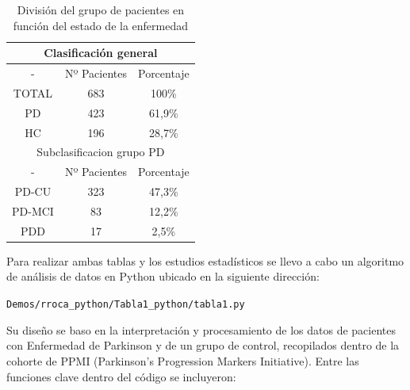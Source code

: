 \begin{table}[t]
	\centering
	\begin{tabular}{|c||c|c|} 
		\hline
		\multicolumn{3}{|c|}{Clasificación general} \\
		\hline
		- &  Nº Pacientes &  Porcentaje\\ 
		\hline
		TOTAL &  683 & 100\% \\
		\hline
		PD & 423 &  61,9\%  \\
		\hline
		HC & 196  &  28,7\%  \\
		\hline
		\multicolumn{3}{|c|}{Subclasificacion grupo PD} \\
		\hline
		- &  Nº Pacientes &  Porcentaje\\
		\hline
		PD-CU &  323 &  47,3\%  \\
		\hline
		PD-MCI &   83 &   12,2\% \\
		\hline
		PDD &  17 &  2,5\%  \\ 
		\bottomrule
	\end{tabular}
	\caption{División del grupo de pacientes en función del estado de la enfermedad}
	\label{tab:tabla4}
\end{table}


Para realizar ambas tablas y los estudios estadísticos se llevo a cabo un algoritmo de análisis de datos en Python ubicado en la siguiente dirección:
\begin{center}
	\texttt{Demos/rroca\_python/Tabla1\_python/tabla1.py}
\end{center} 
Su diseño se baso en la interpretación y procesamiento de los datos de pacientes con Enfermedad de Parkinson y de un grupo de control,  recopilados dentro de la cohorte de PPMI (Parkinson's Progression Markers Initiative). Entre las funciones clave dentro del código se incluyeron:

